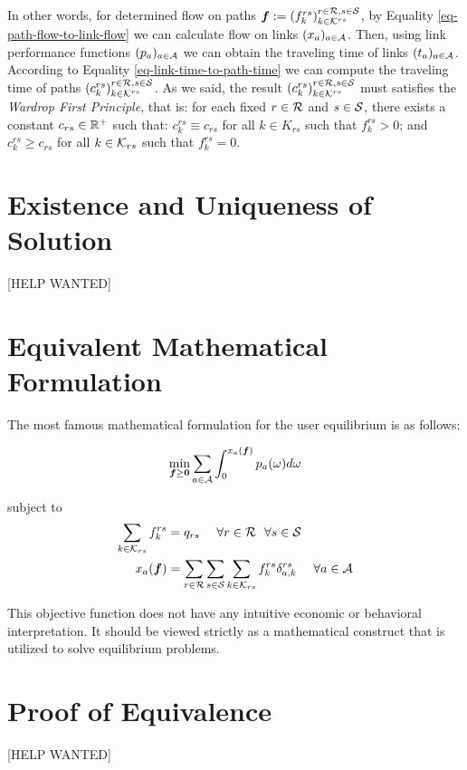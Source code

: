 \documentclass{article}
\begin{document}
In other words, for determined flow on paths $ \boldsymbol{f} := \left( f_k^{rs} \right)_{k \in \mathcal{K}^{rs}}^{r \in \mathcal{R}, s \in \mathcal{S}} $, by Equality \ref{eq-path-flow-to-link-flow} we can calculate flow on links $ (x_a)_{a \in \mathcal{A}} $. Then, using link performance functions $ (p_a)_{a \in \mathcal{A}} $ we can obtain the traveling time of links $ (t_a)_{a \in \mathcal{A}} $. According to Equality \ref{eq-link-time-to-path-time} we can compute the traveling time of paths $ \left( c_k^{rs} \right)_{k \in \mathcal{K}^{rs}}^{r \in \mathcal{R}, s \in \mathcal{S}} $. As we said, the result $ \left( c_k^{rs} \right)_{k \in \mathcal{K}^{rs}}^{r \in \mathcal{R}, s \in \mathcal{S}} $ must satisfies the \textit{Wardrop First Principle}, that is: for each fixed $ r \in \mathcal{R} $ and $ s \in \mathcal{S} $, there exists a constant $ c_{rs} \in \mathbb{R}^+ $ such that: $ c_k^{rs} \equiv c_{rs} $ for all $ k \in K_{rs} $ such that $ f_k^{rs} > 0 $; and $ c_k^{rs} \ge c_{rs} $ for all $ k \in \mathcal{K}_{rs} $ such that $ f_k^{rs} = 0 $. 

\section{Existence and Uniqueness of Solution}

[HELP WANTED]

\section{Equivalent Mathematical Formulation}

The most famous mathematical formulation for the user equilibrium is as follows: 

$$ \min_{\boldsymbol{f} \ge \boldsymbol{0}} \sum_{a \in \mathcal{A}} \int_0^{x_a (\boldsymbol{f})} p_a (\omega) d \omega $$

subject to
\begin{align*}
    \sum_{k \in \mathcal{K}_{rs}} f_{k}^{rs} &= q_{rs} ~~~~ \forall r \in \mathcal{R} ~~ \forall s \in \mathcal{S} \\
    x_a (\boldsymbol{f}) &= \sum_{r \in \mathcal{R}} \sum_{s \in \mathcal{S}} \sum_{k \in \mathcal{K}_{rs}} f_{k}^{rs} \delta_{a, k}^{rs} ~~~~ \forall a \in \mathcal{A}
\end{align*}

This objective function does not have any intuitive economic or behavioral interpretation. It should be viewed strictly as a mathematical construct that is utilized to solve equilibrium problems. \cite{Shef85}

\section{Proof of Equivalence}

[HELP WANTED]

\printbibliography
\end{document}
